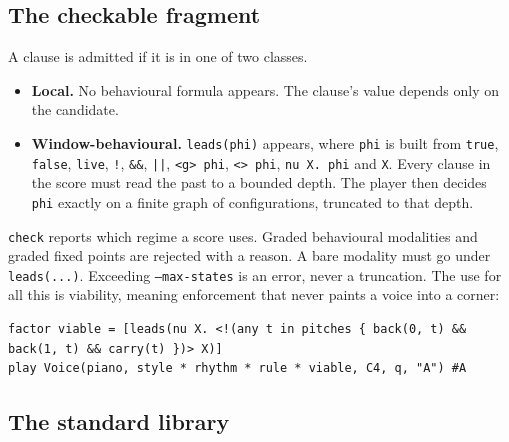 \documentclass[11pt,a4paper]{article}
\newcommand{\ttx}[1]{\texttt{#1}}
\begin{document}
\subsection{The checkable fragment}\label{ssec:fragment}

A clause is admitted if it is in one of two classes.
\begin{itemize}
\item \textbf{Local.} No behavioural formula appears. The clause's value
  depends only on the candidate.
\item \textbf{Window-behavioural.} \ttx{leads(phi)} appears, where
  \ttx{phi} is built from \ttx{true}, \ttx{false}, \ttx{live}, \ttx{!},
  \ttx{\&\&}, \ttx{||}, \ttx{<g> phi}, \ttx{<> phi}, \ttx{nu X. phi} and
  \ttx{X}. Every clause in the score must read the past to a bounded depth. The
  player then decides \ttx{phi} exactly on a finite graph of configurations,
  truncated to that depth.
\end{itemize}
\ttx{check} reports which regime a score uses. Graded behavioural modalities
and graded fixed points are rejected with a reason. A bare modality must go
under \ttx{leads(...)}. Exceeding \ttx{--max-states} is an error, never a
truncation. The use for all this is viability, meaning enforcement that never
paints a voice into a corner:
\begin{lstlisting}[language=score]
factor viable = [leads(nu X. <!(any t in pitches { back(0, t) && back(1, t) && carry(t) })> X)]
play Voice(piano, style * rhythm * rule * viable, C4, q, "A") #A
\end{lstlisting}

\subsection{The standard library}
\end{document}
